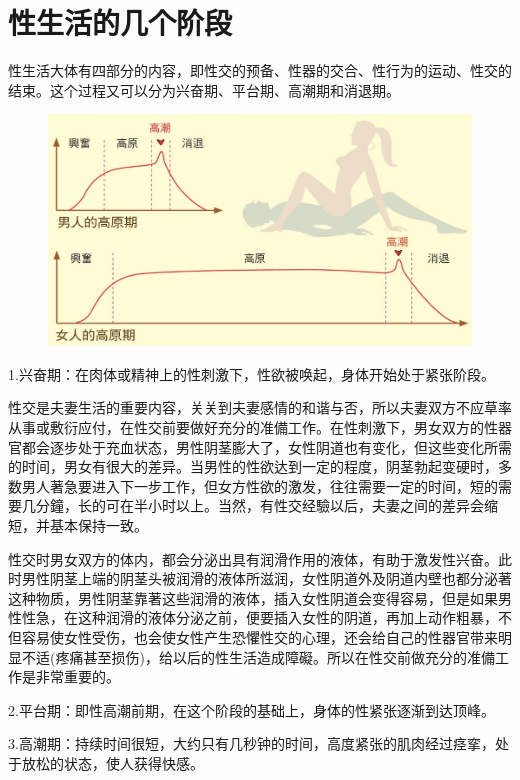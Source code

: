 \documentclass[12pt,UTF8]{ctexbook}
\begin{document}
\chapter{性生活的几个阶段}

性生活大体有四部分的内容，即性交的预备、性器的交合、性行为的运动、性交的结束。这个过程又可以分为兴奋期、平台期、高潮期和消退期。

\begin{figure}[htbp]
	\includegraphics[width=1\linewidth]{6}
	\caption{}
	\label{fig:1}
\end{figure}

1.兴奋期：在肉体或精神上的性刺激下，性欲被唤起，身体开始处于紧张阶段。

性交是夫妻生活的重要内容，关关到夫妻感情的和谐与否，所以夫妻双方不应草率从事或敷衍应付，在性交前要做好充分的准備工作。在性刺激下，男女双方的性器官都会逐步处于充血状态，男性阴茎膨大了，女性阴道也有变化，但这些变化所需的时间，男女有很大的差异。当男性的性欲达到一定的程度，阴茎勃起变硬时，多数男人著急要进入下一步工作，但女方性欲的激发，往往需要一定的时间，短的需要几分鐘，长的可在半小时以上。当然，有性交经驗以后，夫妻之间的差异会缩短，并基本保持一致。

性交时男女双方的体内，都会分泌出具有润滑作用的液体，有助于激发性兴奋。此时男性阴茎上端的阴茎头被润滑的液体所滋润，女性阴道外及阴道内壁也都分泌著这种物质，男性阴茎靠著这些润滑的液体，插入女性阴道会变得容易，但是如果男性性急，在这种润滑的液体分泌之前，便要插入女性的阴道，再加上动作粗暴，不但容易使女性受伤，也会使女性产生恐懼性交的心理，还会给自己的性器官带来明显不适(疼痛甚至损伤)，给以后的性生活造成障礙。所以在性交前做充分的准備工作是非常重要的。

2.平台期：即性高潮前期，在这个阶段的基础上，身体的性紧张逐渐到达顶峰。

3.高潮期：持续时间很短，大约只有几秒钟的时间，高度紧张的肌肉经过痉挛，处于放松的状态，使人获得快感。
\end{document}
